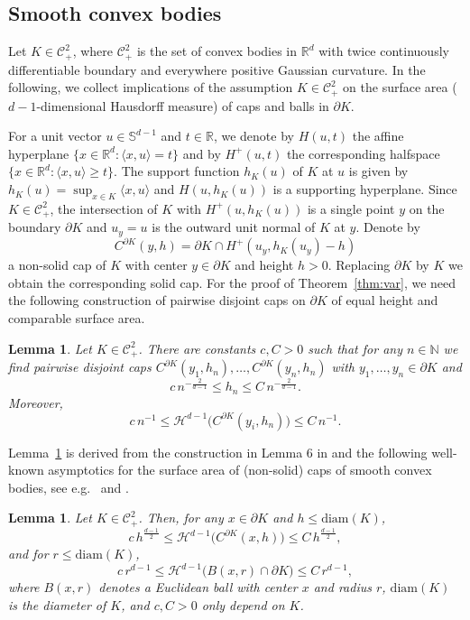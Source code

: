 \documentclass[12pt]{article}
\newcommand{\IN}{\mathds{N}}
\newcommand{\IR}{\mathds{R}}
\newcommand{\diam}{\mathrm{diam}}
\def\cC{{\mathcal C}}
\def\cH{{\mathcal H}}
\def\bd{{\partial}}
\newtheorem{lemma}[theorem]{Lemma}
\theoremstyle{definition}
\begin{document}
\subsection{Smooth convex bodies}\label{sec:smooth}

Let $K\in \cC^2_+$, where $\cC^2_+$ is the set of convex bodies in $\IR^d$ with twice continuously differentiable boundary and everywhere positive Gaussian curvature. In the following, we collect implications of the assumption $K\in \cC^2_+$ on the surface area ($d-1$-dimensional Hausdorff measure) of caps and balls in $\partial K$.

For a unit vector $u\in \mathbb{S}^{d-1}$ and $t\in \IR$, we denote by $H(u,t)$ the affine hyperplane $\{x\in\IR^d\colon  \langle x,u\rangle=t\}$ and by $H^+(u,t)$ the corresponding halfspace $\{x\in\IR^d\colon  \langle x,u\rangle\ge t\}$. The support function $h_K(u)$ of $K$ at $u$ is given by $h_K(u)=\sup_{x\in K}\langle x,u\rangle$ and $H(u,h_K(u))$ is a supporting hyperplane.  Since $K\in \cC^2_+$, the intersection of $K$ with $H^+(u,h_K(u))$ is a single point $y$ on the boundary $\bd K$ and $u_y=u$ is the outward unit normal of $K$ at $y$. Denote by
\[
C^{\bd K}(y,h)
=\bd K\cap H^+(u_y,h_K(u_y)-h)
\]
a non-solid cap of $K$ with center $y\in \bd K$ and height $h>0$. Replacing $\bd K$ by $K$ we obtain the corresponding solid cap. For the proof of Theorem~\ref{thm:var}, we need the following construction of pairwise disjoint caps on $\bd K$ of equal height and comparable surface area. 

\begin{lemma}\label{lem:covering}
Let $K\in \cC^2_+$. There are constants $c,C>0$ such that for any $n\in\IN$ we find pairwise disjoint caps $C^{\bd K}(y_1,h_n),\dots,C^{\partial K}(y_n,h_n)$	with $y_1,\dots,y_n\in \partial K$ and 
\[
c\, n^{-\frac{2}{d-1}}
\le h_n
\le C\, n^{-\frac{2}{d-1}}.
\]
Moreover,
\[
c\, n^{-1}\le \cH^{d-1}\big(C^{\bd K}(y_i,h_n)\big)\le C\, n^{-1}.
\]
\end{lemma}

Lemma~\ref{lem:covering} is derived from the construction in Lemma 6 in \cite{Reitz05} and the following well-known asymptotics for the surface area of (non-solid) caps of smooth convex bodies, see e.g.~\cite[Lemma~6.2]{RVW08} and \cite[Lemma~5]{Reitz05}.

\begin{lemma}\label{lem:cap-convex}
Let $K\in \cC_+^2$. Then, for any $x\in \bd K$ and $h\le \diam(K)$, 
\[
c\, h^{\frac{d-1}{2}}
\le \cH^{d-1}\big(C^{\bd K}(x,h)\big)
\le C\, h^{\frac{d-1}{2}},
\]
and for $r\le \diam(K)$,
\begin{equation*} 
c \, r^{d-1}
\le \cH^{d-1}\big(B(x,r)\cap \bd K\big)
\le C\, r^{d-1},
\end{equation*}
where $B(x,r)$ denotes a Euclidean ball with center $x$ and radius $r$, $\diam(K)$ is the diameter of $K$, and $c,C>0$ only depend on $K$.
\end{lemma}
\end{document}
